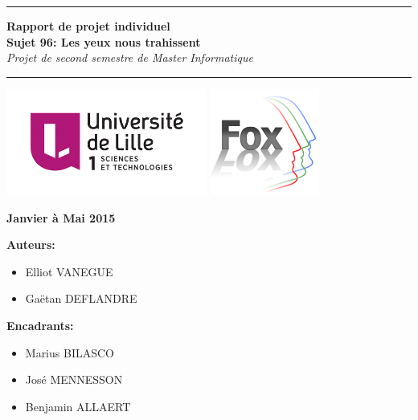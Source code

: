 \pagestyle{empty}



\begin{center}
  \hrule
  \vspace{1cm}
  \textbf{
  {\LARGE  
    Rapport de projet individuel\\
    \vspace{0.3cm}
    Sujet 96: Les yeux nous trahissent
  }}\\
  \vspace{0.8cm}
  {\large\textit{\textcolor{mygray}{Projet de second semestre de Master Informatique}}}\\
  \vspace{0.8cm}
  \hrule

  \vspace{3cm}
  \includegraphics[height=3.5cm]{image/logoLILLE1.jpg}
  \hfill
  \includegraphics[height=3.5cm]{image/logoFOX.png}
  \vspace{4cm}

  \vspace{1cm}
  {\large\textbf{\textcolor{univmodif}{Janvier à Mai 2015}}}
  \vspace{2cm}
\end{center}

\begin{multicols}{2}  

    \textbf{\textcolor{univmodif}{Auteurs:}}\\
    \begin{itemize}
      \item Elliot VANEGUE
      \item Gaëtan DEFLANDRE
    \end{itemize}
    
    \textbf{\textcolor{univmodif}{Encadrants:}}
    \begin{itemize}
      \item Marius BILASCO
      \item José MENNESSON
      \item Benjamin ALLAERT
    \end{itemize}

\end{multicols}